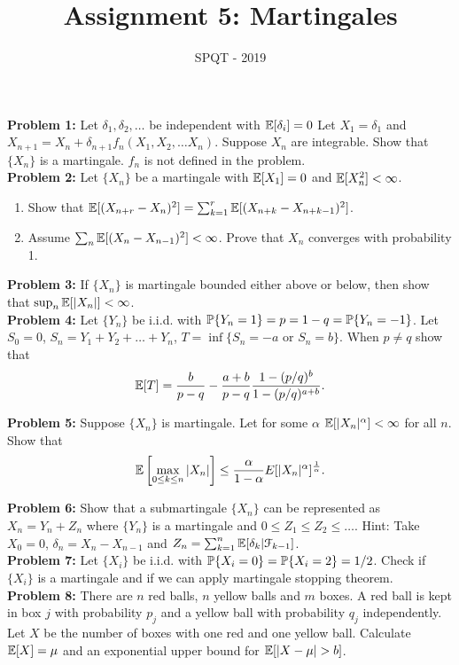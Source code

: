 \documentclass[a4paper,11pt,english]{article}
\title{Assignment 5: Martingales}
\author{SPQT - 2019}
\begin{document}
\maketitle
\textbf{Problem 1:} Let $\delta_1, \delta_2,\dots$ be independent with $\E[\delta_i] = 0$ Let $X_1 = \delta_1$ and $X_{n+1} = X_n + \delta_{n+1} f_n(X_1,X_2,\dots X_n)$. Suppose $X_n$ are integrable. Show that $\{X_n\}$ is a martingale. {\color{red} $f_n$ is not defined in the problem.}\\

\indent \textbf{Problem 2:} Let $\{X_n\}$ be a martingale with $\E[X_1] = 0$ and $\E[X_n^2] < \infty$.
\begin{enumerate}
\item Show that $\E[(X_{n+r} - X_n)^2] = \sum_{k=1}^r \E[(X_{n+k} - X_{n+k-1})^2]$.
\item Assume $\sum_n \E[(X_n - X_{n-1})^2] < \infty$. Prove that $X_n$ converges with probability 1.
\end{enumerate} 

\indent \textbf{Problem 3:} If $\{X_n\}$ is martingale bounded either above or below, then show that $\sup_n \E[|X_n|] < \infty$.\\

\indent \textbf{Problem 4:} Let $\{Y_n\}$ be i.i.d. with $\P\{Y_n = 1\} = p = 1-q = \P\{Y_n = -1\}$. Let $S_0 =0$, $S_n = Y_1+Y_2+\dots +Y_n$, $T = \inf\{S_n = -a$ or $S_n = b\}$. When $p \neq q$ show that 
\begin{align*}
\E[T] = \frac{b}{p-q} - \frac{a+b}{p-q} \frac{1-(p/q)^b}{1-(p/q)^{a+b}}.
\end{align*}

\indent \textbf{Problem 5:} Suppose $\{X_n\}$ is martingale. Let for some $\alpha$ $\E[|X_n|^\alpha] < \infty$ for all $n$. Show that 
\begin{align*}
\E \left[\max_{0\leq k \leq n} |X_n|\right] \leq \frac{\alpha}{1-\alpha} E[|X_n|^\alpha]^{\frac{1}{\alpha}}.
\end{align*}

\indent \textbf{Problem 6:} Show that a submartingale $\{X_n\}$ can be represented as $X_n = Y_n + Z_n$ where $\{Y_n\}$ is a martingale and $0 \leq Z_1 \leq Z_2 \leq \dots$. Hint: Take $X_0 = 0$, $\delta_n = X_n - X_{n-1}$ and $Z_n = \sum_{k=1}^n \E[\delta_k|\mathcal{F}_{k-1}]$. \\

\indent \textbf{Problem 7:}  Let $\{X_i\}$ be i.i.d. with $\P\{X_i = 0\} = \P\{X_i = 2\} = 1/2$. Check if $\{X_i\}$ is a martingale and if we can apply martingale stopping theorem. \\

\indent \textbf{Problem 8:} There are $n$ red balls, $n$ yellow balls and $m$ boxes. A red ball is kept in box $j$ with probability $p_j$ and a yellow ball with probability $q_j$ independently. Let $X$ be the number of boxes with one red and one yellow ball. Calculate $\E[X] = \mu $ and an exponential upper bound for $\E[|X-\mu|>b]$.
 
\end{document}
